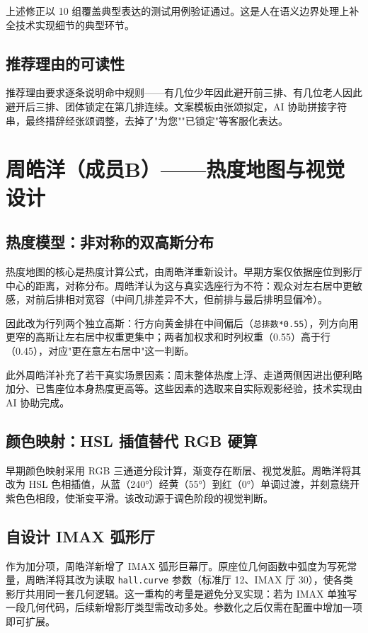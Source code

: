 \documentclass[12pt,a4paper]{ctexart}
\begin{document}
上述修正以 10 组覆盖典型表达的测试用例验证通过。这是人在语义边界处理上补全技术实现细节的典型环节。

\subsection{推荐理由的可读性}

推荐理由要求逐条说明命中规则——有几位少年因此避开前三排、有几位老人因此避开后三排、团体锁定在第几排连续。文案模板由张颂拟定，AI 协助拼接字符串，最终措辞经张颂调整，去掉了"为您""已锁定"等客服化表达。

\section{周皓洋（成员B）——热度地图与视觉设计}

\subsection{热度模型：非对称的双高斯分布}

热度地图的核心是热度计算公式，由周皓洋重新设计。早期方案仅依据座位到影厅中心的距离，对称分布。周皓洋认为这与真实选座行为不符：观众对左右居中更敏感，对前后排相对宽容（中间几排差异不大，但前排与最后排明显偏冷）。

因此改为行列两个独立高斯：行方向黄金排在中间偏后（\texttt{总排数*0.55}），列方向用更窄的高斯让左右居中权重更集中；两者加权求和时列权重（0.55）高于行（0.45），对应"更在意左右居中"这一判断。

此外周皓洋补充了若干真实场景因素：周末整体热度上浮、走道两侧因进出便利略加分、已售座位本身热度更高等。这些因素的选取来自实际观影经验，技术实现由 AI 协助完成。

\subsection{颜色映射：HSL 插值替代 RGB 硬算}

早期颜色映射采用 RGB 三通道分段计算，渐变存在断层、视觉发脏。周皓洋将其改为 HSL 色相插值，从蓝（240°）经黄（55°）到红（0°）单调过渡，并刻意绕开紫色色相段，使渐变平滑。该改动源于调色阶段的视觉判断。

\subsection{自设计 IMAX 弧形厅}

作为加分项，周皓洋新增了 IMAX 弧形巨幕厅。原座位几何函数中弧度为写死常量，周皓洋将其改为读取 \texttt{hall.curve} 参数（标准厅 12、IMAX 厅 30），使各类影厅共用同一套几何逻辑。这一重构的考量是避免分叉实现：若为 IMAX 单独写一段几何代码，后续新增影厅类型需改动多处。参数化之后仅需在配置中增加一项即可扩展。
\end{document}

